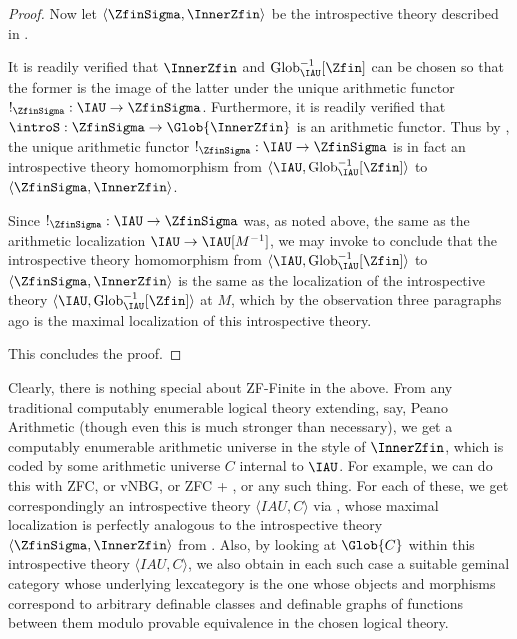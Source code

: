 \begin{proof}
Now let $\langle \ZfinSigma, \InnerZfin \rangle$ be the introspective theory described in .

It is readily verified that $\InnerZfin$ and $\IAUGlob^{-1}[\Zfin]$ can be chosen so that the former is the image of the latter under the unique arithmetic functor $!_{\ZfinSigma} : \IAU \to \ZfinSigma$. Furthermore, it is readily verified that $\introS : \ZfinSigma \to \Glob{\InnerZfin}$ is an arithmetic functor. Thus by , the unique arithmetic functor $!_{\ZfinSigma} : \IAU \to \ZfinSigma$ is in fact an introspective theory homomorphism from $\langle \IAU, \IAUGlob^{-1}[\Zfin] \rangle$ to $\langle \ZfinSigma, \InnerZfin \rangle$.

Since $!_{\ZfinSigma} : \IAU \to \ZfinSigma$ was, as noted above, the same as the arithmetic localization $\IAU \to \IAU[M^{-1}]$, we may invoke  to conclude that the introspective theory homomorphism from $\langle \IAU, \IAUGlob^{-1}[\Zfin] \rangle$ to $\langle \ZfinSigma, \InnerZfin \rangle$ is the same as the localization of the introspective theory $\langle \IAU, \IAUGlob^{-1}[\Zfin] \rangle$ at $M$, which by the observation three paragraphs ago is the maximal localization of this introspective theory.

This concludes the proof.
\end{proof}

Clearly, there is nothing special about ZF-Finite in the above. From any traditional computably enumerable logical theory extending, say, Peano Arithmetic (though even this is much stronger than necessary), we get a computably enumerable arithmetic universe in the style of $\InnerZfin$, which is coded by some arithmetic universe $C$ internal to $\IAU$. For example, we can do this with ZFC, or vNBG, or ZFC + , or any such thing. For each of these, we get correspondingly an introspective theory $\langle IAU, C \rangle$ via , whose maximal localization is perfectly analogous to the introspective theory $\langle \ZfinSigma, \InnerZfin \rangle$ from . Also, by looking at $\Glob{C}$ within this introspective theory $\langle IAU, C \rangle$, we also obtain in each such case a suitable geminal category whose underlying lexcategory is the one whose objects and morphisms correspond to arbitrary definable classes and definable graphs of functions between them modulo provable equivalence in the chosen logical theory.

